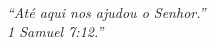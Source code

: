 \begin{epigrafe}
    \vspace*{\fill}
    \begin{flushright}

        \textit{\\“Até aqui nos ajudou o Senhor.” 
\\1 Samuel 7:12.”\\
 }
    \end{flushright}
\end{epigrafe}